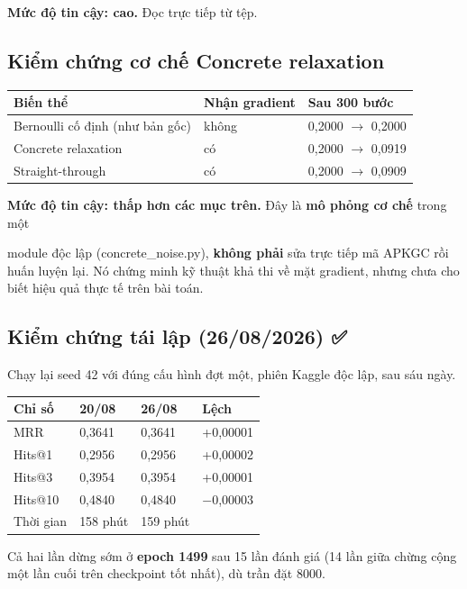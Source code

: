 \documentclass[11pt,a4paper]{article}
\newcommand{\code}[1]{{\ttfamily\small\color{codetext}#1}}
\begin{document}
\textbf{Mức độ tin cậy: cao.} Đọc trực tiếp từ tệp.

\subsection{Kiểm chứng cơ chế Concrete relaxation}
\begin{center}\small
\begin{tabular}{@{}lll@{}}
\toprule
\textbf{Biến thể} & \textbf{Nhận gradient} & \textbf{Sau 300 bước}\\
\midrule
Bernoulli cố định (như bản gốc) & không & 0,2000 $\rightarrow$ 0,2000\\
Concrete relaxation & có & 0,2000 $\rightarrow$ 0,0919\\
Straight-through & có & 0,2000 $\rightarrow$ 0,0909\\
\bottomrule
\end{tabular}
\end{center}
\textbf{Mức độ tin cậy: thấp hơn các mục trên.} Đây là \textbf{mô phỏng cơ chế} trong một

module độc lập (\code{concrete\_noise.py}), \textbf{không phải} sửa trực tiếp mã APKGC rồi huấn luyện lại. Nó chứng minh kỹ thuật khả thi về mặt gradient, nhưng chưa cho biết hiệu quả thực tế trên bài toán.

\subsection{Kiểm chứng tái lập (26/08/2026) ✅}
Chạy lại seed 42 với đúng cấu hình đợt một, phiên Kaggle độc lập, sau sáu ngày.

\begin{center}\small
\begin{tabular}{@{}llll@{}}
\toprule
\textbf{Chỉ số} & \textbf{20/08} & \textbf{26/08} & \textbf{Lệch}\\
\midrule
MRR & 0,3641 & 0,3641 & +0,00001\\
Hits@1 & 0,2956 & 0,2956 & +0,00002\\
Hits@3 & 0,3954 & 0,3954 & +0,00001\\
Hits@10 & 0,4840 & 0,4840 & −0,00003\\
Thời gian & 158 phút & 159 phút & \\
\bottomrule
\end{tabular}
\end{center}
Cả hai lần dừng sớm ở \textbf{epoch 1499} sau 15 lần đánh giá (14 lần giữa chừng cộng một lần cuối trên checkpoint tốt nhất), dù trần đặt 8000.
\end{document}
